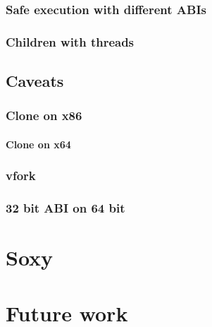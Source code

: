 \documentclass[a4paper, twoside, 10pt]{report}
\begin{document}
\subsection{Safe execution with different ABIs}

%

\subsection{Children with threads}

\section{Caveats}
%

\subsection{Clone on x86}


\subsubsection{Clone on x64}


\subsection{vfork}


\subsection{32 bit ABI on 64 bit}



\chapter{Soxy}






\chapter{Future work}
\end{document}
